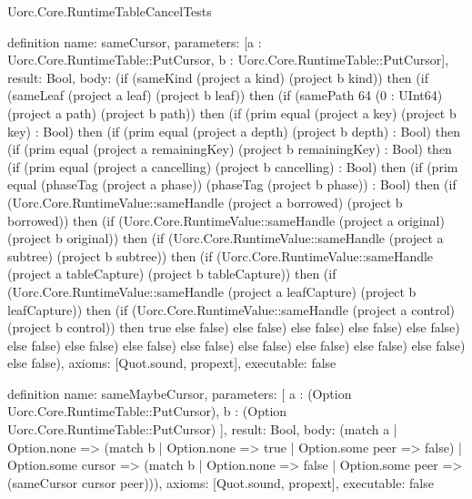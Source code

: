 \begin{lexlean}{Uorc.Core.RuntimeTableCancelTests}
\begin{semanticmodule}
definition{
  name: sameCursor,
  parameters: [a : Uorc.Core.RuntimeTable::PutCursor, b : Uorc.Core.RuntimeTable::PutCursor],
  result: Bool,
  body: (if (sameKind (project a kind) (project b kind)) then (if (sameLeaf (project a leaf) (project b leaf)) then (if (samePath 64 (0 : UInt64) (project a path) (project b path)) then (if (prim equal (project a key) (project b key) : Bool) then (if (prim equal (project a depth) (project b depth) : Bool) then (if (prim equal (project a remainingKey) (project b remainingKey) : Bool) then (if (prim equal (project a cancelling) (project b cancelling) : Bool) then (if (prim equal (phaseTag (project a phase)) (phaseTag (project b phase)) : Bool) then (if (Uorc.Core.RuntimeValue::sameHandle (project a borrowed) (project b borrowed)) then (if (Uorc.Core.RuntimeValue::sameHandle (project a original) (project b original)) then (if (Uorc.Core.RuntimeValue::sameHandle (project a subtree) (project b subtree)) then (if (Uorc.Core.RuntimeValue::sameHandle (project a tableCapture) (project b tableCapture)) then (if (Uorc.Core.RuntimeValue::sameHandle (project a leafCapture) (project b leafCapture)) then (if (Uorc.Core.RuntimeValue::sameHandle (project a control) (project b control)) then true else false) else false) else false) else false) else false) else false) else false) else false) else false) else false) else false) else false) else false) else false),
  axioms: [Quot.sound, propext],
  executable: false
}

definition{
  name: sameMaybeCursor,
  parameters: [
    a : (Option Uorc.Core.RuntimeTable::PutCursor),
    b : (Option Uorc.Core.RuntimeTable::PutCursor)
  ],
  result: Bool,
  body: (match a
    | Option.none => (match b | Option.none => true | Option.some peer => false)
    | Option.some cursor => (match b
      | Option.none => false
      | Option.some peer => (sameCursor cursor peer))),
  axioms: [Quot.sound, propext],
  executable: false
}


\end{semanticmodule}
\end{lexlean}
